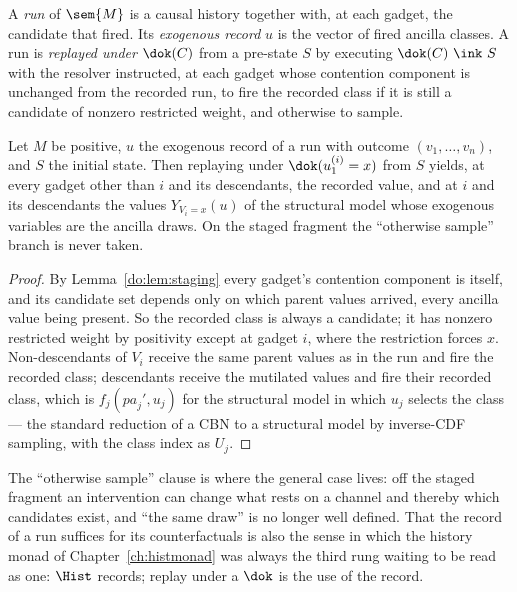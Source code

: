 \begin{definition}
\label{do:def:record}
A \emph{run} of $\sem{M}$ is a causal history together with, at each gadget, the candidate that
fired. Its \emph{exogenous record} $u$ is the vector of fired ancilla classes. A run is
\emph{replayed under} $\dok(C)$ from a pre-state $S$ by executing $\dok(C)\ \ink\ S$ with the
resolver instructed, at each gadget whose contention component is unchanged from the recorded run,
to fire the recorded class if it is still a candidate of nonzero restricted weight, and otherwise
to sample.
\end{definition}

\begin{theorem}
\label{do:thm:cf}
Let $M$ be positive, $u$ the exogenous record of a run with outcome $(v_1,\dots,v_n)$, and $S$ the
initial state. Then replaying under $\dok(u^{(i)}_1 = x)$ from $S$ yields, at every gadget other
than $i$ and its descendants, the recorded value, and at $i$ and its descendants the values
$Y_{V_i = x}(u)$ of the structural model whose exogenous variables are the ancilla draws. On the
staged fragment the ``otherwise sample'' branch is never taken.
\end{theorem}

\begin{proof}
By Lemma~\ref{do:lem:staging} every gadget's contention component is itself, and its candidate set
depends only on which parent values arrived, every ancilla value being present. So the recorded
class is always a candidate; it has nonzero restricted weight by positivity except at gadget $i$,
where the restriction forces $x$. Non-descendants of $V_i$ receive the same parent values as in the
run and fire the recorded class; descendants receive the mutilated values and fire their recorded
class, which is $f_j(\mathit{pa}_j', u_j)$ for the structural model in which $u_j$ selects the
class --- the standard reduction of a CBN to a structural model by inverse-CDF sampling, with the
class index as $U_j$.
\end{proof}

The ``otherwise sample'' clause is where the general case lives: off the staged fragment an
intervention can change what rests on a channel and thereby which candidates exist, and ``the same
draw'' is no longer well defined. That the record of a run suffices for its counterfactuals is also
the sense in which the history monad of Chapter~\ref{ch:histmonad} was always the third rung
waiting to be read as one: $\Hist$ records; replay under a $\dok$ is the use of the record.

